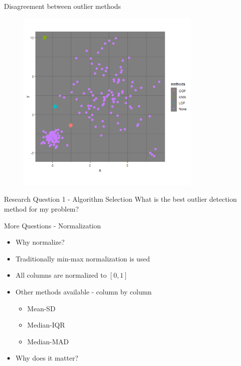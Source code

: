 \documentclass{beamer}
\begin{document}
\begin{darkframes}
\begin{frame}{Disagreement between outlier methods}
       \begin{figure}
    \captionsetup[subfigure]{labelformat=empty}
     \centering
		\includegraphics[width=0.8\textwidth]{example3.png}
	\end{figure}
\end{frame}



\begin{frame}{Research Question 1 - Algorithm Selection}
    \centering
    {\huge What is the best outlier detection } \\ \vspace{0.5cm}
    {\huge method for my problem?}
\end{frame}	

	\begin{frame}{More Questions - Normalization}
	\begin{itemize}
		\item Why normalize?
		\item Traditionally min-max normalization is used
		\item All columns are normalized to $[0, 1]$
		\item Other methods available - column by column
		\begin{itemize}
			\item Mean-SD
			\item Median-IQR
			\item Median-MAD
		\end{itemize}
		\vspace{1cm}		
		\item { \Large Why does it matter? }
		\end{itemize}
	\end{frame}


\end{darkframes}
\end{document}
